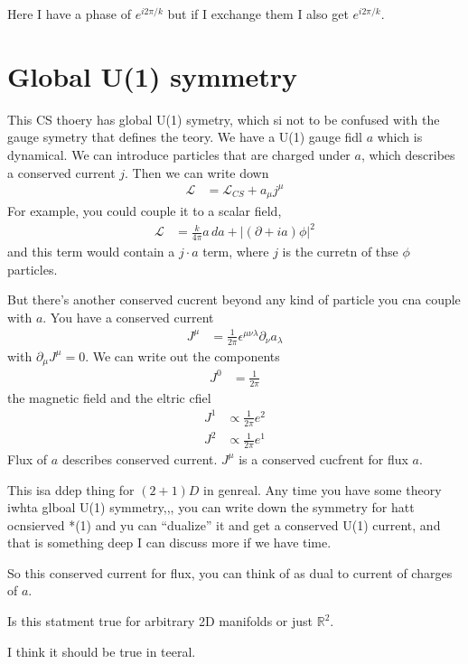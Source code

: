Here I have a phase of $e^{i2\pi/k}$
but if I exchange them I also get $e^{i2\pi /k}$.

\section{Global U(1) symmetry}
This CS thoery has global U(1) symetry,
which si not to be confused with the gauge symetry that defines the teory.
We have a U(1) gauge fidl $a$ which is dynamical.
We can introduce particles that are charged under $a$,
which describes a conserved current $j$.
Then we can write down
\begin{align}
    \mathcal{L}
    &=
    \mathcal{L}_{CS}
    + a_\mu j^\mu
\end{align}
For example,
you could couple it to a scalar field,
\begin{align}
    \mathcal{L}
    &=
    \frac{k}{4\pi} a\, da
    +
    |\left( \partial + ia \right)\phi|^2
\end{align}
and this term would contain a $j\cdot a$ term,
where $j$ is the curretn of thse $\phi$ particles.

But there's another conserved cucrent beyond any kind of particle you cna couple
with $a$.
You have a conserved current
\begin{align}
    J^\mu &=
    \frac{1}{2\pi}
    \epsilon^{\mu\nu\lambda}
    \partial_\nu a_\lambda
\end{align}
with $\partial_\mu J^\mu = 0$.
We can write out the components
\begin{align}
    J^0 &= \frac{1}{2\pi}
\end{align}
the magnetic field and the eltric cfiel
\begin{align}
    J^1 &\propto \frac{1}{2\pi}e^2\\
    J^2 &\propto \frac{1}{2\pi} e^1
\end{align}
Flux of $a$ describes  conserved current.
$J^\mu$ is a conserved cucfrent for flux $a$.

This isa ddep thing for $(2+1)D$ in genreal.
Any time you have some theory iwhta glboal U(1) symmetry,,,
you can write down the symmetry for hatt ocnsierved *(1)
and yu can ``dualize'' it and get a conserved U(1) current,
and that is something deep I can discuss more if we have time.

So this conserved current for flux,
you can think of as dual to current of charges of $a$.

\begin{question}
    Is this statment true for arbitrary 2D manifolds or just $\mathbb{R}^2$.
\end{question}
I think it should be true in teeral.

